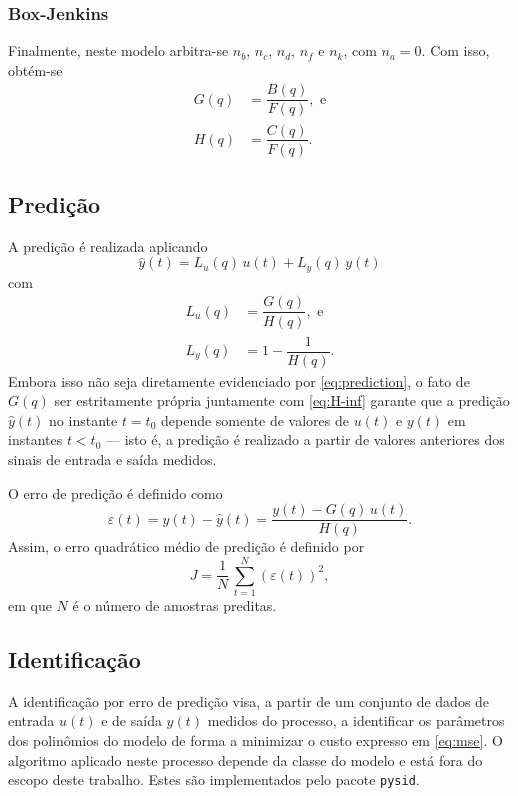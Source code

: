 \documentclass{ppgeesa}
\newcommand{\Prod}{\,}
\begin{document}
\subsubsection{Box-Jenkins}
Finalmente, neste modelo arbitra-se $n_b$, $n_c$, $n_d$, $n_f$ e $n_k$, com $n_a = 0$.
Com isso, obtém-se
\begin{align}
  G(q) &= \dfrac{B(q)}{F(q)}
  , \text{ e}
  \\
  H(q) &= \dfrac{C(q)}{F(q)}
  .
\end{align}

\subsection{Predição}

A predição é realizada aplicando
\begin{equation}\label{eq:prediction}
  \hat{y}(t) = L_u(q) \Prod u(t) + L_y(q) \Prod y(t)
\end{equation}
com
\begin{align}
  L_u(q) &= \dfrac{G(q)}{H(q)}
  , \text{ e}
  \\
  L_y(q) &= 1 - \dfrac{1}{H(q)}
  .
\end{align}
Embora isso não seja diretamente evidenciado por \eqref{eq:prediction}, o fato de $G(q)$ ser estritamente própria juntamente com \eqref{eq:H-inf} garante que a predição $\hat{y}(t)$ no instante $t = t_0$ depende somente de valores de $u(t)$ e $y(t)$ em instantes $t < t_0$ --- isto é, a predição é realizado a partir de valores anteriores dos sinais de entrada e saída medidos.

O erro de predição é definido como
\begin{equation}
  \varepsilon(t)
  = y(t) - \hat{y}(t)
  = \dfrac{y(t) - G(q) \Prod u(t)}{H(q)}
  .
\end{equation}
Assim, o erro quadrático médio de predição é definido por
\begin{equation}\label{eq:mse}
  J = \dfrac{1}{N} \Prod \sum_{t=1}^{N}{\left(\varepsilon(t)\right)^2}
  ,
\end{equation}
em que $N$ é o número de amostras preditas.

\subsection{Identificação}
A identificação por erro de predição visa, a partir de um conjunto de dados de entrada $u(t)$ e de saída $y(t)$ medidos do processo, a identificar os parâmetros dos polinômios do modelo de forma a minimizar o custo expresso em \eqref{eq:mse}.
O algoritmo aplicado neste processo depende da classe do modelo e está fora do escopo deste trabalho.
Estes são implementados pelo pacote \texttt{pysid}.
\end{document}
